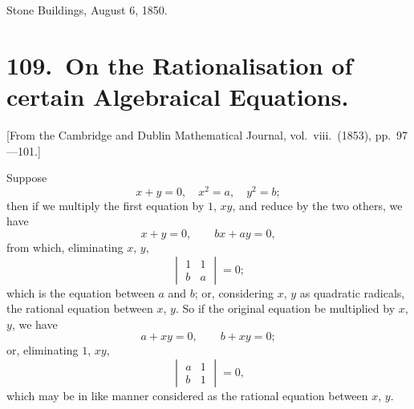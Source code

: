 \documentclass[11pt,a4paper]{article}
\theoremstyle{plain}
\begin{document}
\begin{flushright}
Stone Buildings, August 6, 1850.
\end{flushright}
\clearpage


\section*{109.\ On the Rationalisation of certain Algebraical Equations.}

[From the Cambridge and Dublin Mathematical Journal, vol.\ viii.\ (1853), pp.\ 97---101.]

\bigskip

Suppose
\[x + y = 0, \quad x^2 = a, \quad y^2 = b;\]
then if we multiply the first equation by $1$, $xy$, and reduce by the two others, we have
\[x + y = 0, \qquad bx + ay = 0,\]
from which, eliminating $x$, $y$,
\[\begin{vmatrix} 1 & 1 \\ b & a \end{vmatrix} = 0;\]
which is the equation between $a$ and $b$; or, considering $x$, $y$ as quadratic radicals, the rational equation between $x$, $y$. So if the original equation be multiplied by $x$, $y$, we have
\[a + xy = 0, \qquad b + xy = 0;\]
or, eliminating $1$, $xy$,
\[\begin{vmatrix} a & 1 \\ b & 1 \end{vmatrix} = 0,\]
which may be in like manner considered as the rational equation between $x$, $y$.
\end{document}
